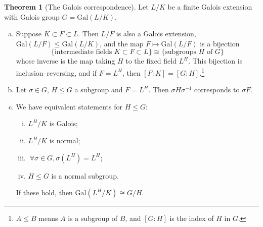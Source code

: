 \documentclass{article}
\theoremstyle{definition}
\newtheorem{theorem}{Theorem}[section]
\begin{document}
\begin{theorem}[The Galois correspondence]
    Let $L/K$ be a finite Galois extension with Galois group $G = \text{Gal}(L/K)$.
    \begin{enumerate}[(a)]
        \item Suppose $K \subset F\subset L$. Then $L/F$ is also a Galois extension, $\text{Gal}(L/F) \le \text{Gal}(L/K)$, and the map $F \mapsto \text{Gal}(L/F)$ is a bijection \[
        \{\text{intermediate fields } K \subset F \subset L\} \cong \{\text{subgroups }H \text{ of }G\}
        \]
        whose inverse is the map taking $H$ to the fixed field $L^H$. This bijection is inclusion--reversing, and if $F=L^H$, then $[F : K] = [G : H]$.\footnote{$A\le B$ means $A$ is a subgroup of $B$, and $[G:H]$ is the index of $H$ in $G$.}
        \item Let $\sigma \in G$, $H \le G$ a subgroup and $F = L^H$. Then $\sigma H \sigma^{-1}$ corresponds to $\sigma F$.
        \item We have equivalent statements for $H \le G$:
        \begin{enumerate}[(i)]
            \item $L^H/K$ is Galois;
            \item $L^H/K$ is normal;
            \item $~\forall \sigma \in G, \sigma(L^H)=L^H$;
            \item $H \le G$ is a normal subgroup.
        \end{enumerate}
        If these hold, then $\text{Gal}(L^H/K)\cong G/H$.
    \end{enumerate}
\end{theorem}
\end{document}
